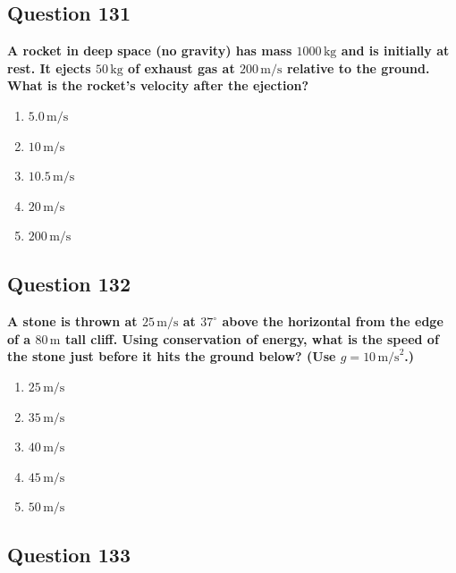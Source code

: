 \documentclass[12pt,letterpaper]{article}
\begin{document}
\subsection{Question 131}

\begin{questionbox}
\textbf{A rocket in deep space (no gravity) has mass $1000\,\text{kg}$ and is initially at rest. It ejects $50\,\text{kg}$ of exhaust gas at $200\,\text{m/s}$ relative to the ground. What is the rocket's velocity after the ejection?}

\begin{enumerate}[label=\alph*)]
    \item $5.0\,\text{m/s}$
    \item $10\,\text{m/s}$
    \item $10.5\,\text{m/s}$
    \item $20\,\text{m/s}$
    \item $200\,\text{m/s}$
\end{enumerate}
\end{questionbox}

\subsection{Question 132}

\begin{questionbox}
\textbf{A stone is thrown at $25\,\text{m/s}$ at $37^\circ$ above the horizontal from the edge of a $80\,\text{m}$ tall cliff. Using conservation of energy, what is the speed of the stone just before it hits the ground below? (Use $g = 10\,\text{m/s}^2$.)}

\begin{enumerate}[label=\alph*)]
    \item $25\,\text{m/s}$
    \item $35\,\text{m/s}$
    \item $40\,\text{m/s}$
    \item $45\,\text{m/s}$
    \item $50\,\text{m/s}$
\end{enumerate}
\end{questionbox}

\subsection{Question 133}
\end{document}
